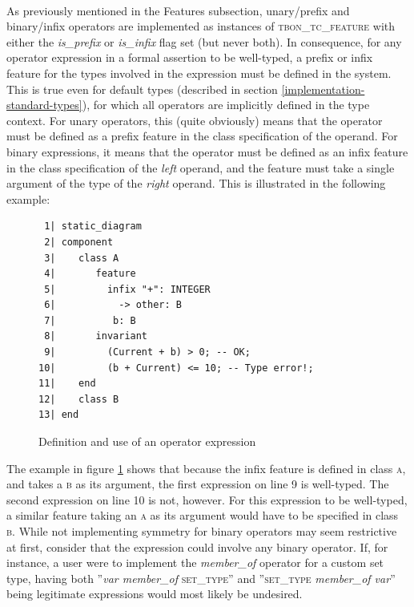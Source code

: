 \paragraph{}
As previously mentioned in the Features subsection, unary/prefix and binary/infix operators are implemented as instances of \textsc{tbon\_tc\_feature} with either the \textit{is\_prefix} or \textit{is\_infix} flag set (but never both). In consequence, for any operator expression in a formal assertion to be well-typed, a prefix or infix feature for the types involved in the expression must be defined in the system. This is true even for default types (described in section \ref{implementation-standard-types}), for which all operators are implicitly defined in the type context. For unary operators, this (quite obviously) means that the operator must be defined as a prefix feature in the class specification of the operand. For binary expressions, it means that the operator must be defined as an infix feature in the class specification of the \emph{left} operand, and the feature must take a single argument of the type of the \emph{right} operand. This is illustrated in the following example:
\begin{figure}[H]
{\footnotesize
\begin{verbatim}
 1| static_diagram
 2| component
 3|    class A
 4|       feature
 5|         infix "+": INTEGER
 6|           -> other: B  
 7|          b: B
 8|       invariant
 9|         (Current + b) > 0; -- OK;
10|         (b + Current) <= 10; -- Type error!;
11|    end
12|    class B
13| end
\end{verbatim}
}
\caption{Definition and use of an operator expression}
\label{fig:operator_expressions}
\end{figure}
The example in figure \ref{fig:operator_expressions} shows that because the infix feature is defined in class \textsc{a}, and takes a \textsc{b} as its argument, the first expression on line 9 is well-typed. The second expression on line 10 is not, however. For this expression to be well-typed, a similar feature taking an \textsc{a} as its argument would have to be specified in class \textsc{b}. While not implementing symmetry for binary operators may seem restrictive at first, consider that the expression could involve any binary operator. If, for instance, a user were to implement the \textit{member\_of} operator for a custom set type, having both ''\textit{var member\_of} \textsc{set\_type}''  and ''\textsc{set\_type} \textit{member\_of var}'' being legitimate expressions would most likely be undesired.
